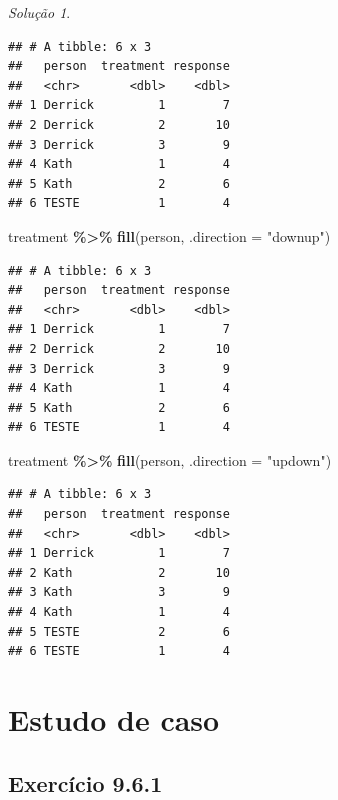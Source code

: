 \documentclass[
]{latex/krantz}
\newenvironment{Shaded}{\begin{snugshade}}{\end{snugshade}}
\newcommand{\AttributeTok}[1]{\textcolor[rgb]{0.13,0.29,0.53}{#1}}
\newcommand{\FunctionTok}[1]{\textcolor[rgb]{0.13,0.29,0.53}{\textbf{#1}}}
\newcommand{\NormalTok}[1]{#1}
\newcommand{\SpecialCharTok}[1]{\textcolor[rgb]{0.81,0.36,0.00}{\textbf{#1}}}
\newcommand{\StringTok}[1]{\textcolor[rgb]{0.31,0.60,0.02}{#1}}
\theoremstyle{definition}
\theoremstyle{definition}
\theoremstyle{definition}
\theoremstyle{definition}
\theoremstyle{remark}
\newtheorem*{solution}{Solução}
\begin{document}
\begin{solution}
\begin{verbatim}
## # A tibble: 6 x 3
##   person  treatment response
##   <chr>       <dbl>    <dbl>
## 1 Derrick         1        7
## 2 Derrick         2       10
## 3 Derrick         3        9
## 4 Kath            1        4
## 5 Kath            2        6
## 6 TESTE           1        4
\end{verbatim}

\begin{Shaded}
\begin{Highlighting}[]
\NormalTok{treatment }\SpecialCharTok{\%\textgreater{}\%} \FunctionTok{fill}\NormalTok{(person, }\AttributeTok{.direction =} \StringTok{"downup"}\NormalTok{)}
\end{Highlighting}
\end{Shaded}

\begin{verbatim}
## # A tibble: 6 x 3
##   person  treatment response
##   <chr>       <dbl>    <dbl>
## 1 Derrick         1        7
## 2 Derrick         2       10
## 3 Derrick         3        9
## 4 Kath            1        4
## 5 Kath            2        6
## 6 TESTE           1        4
\end{verbatim}

\begin{Shaded}
\begin{Highlighting}[]
\NormalTok{treatment }\SpecialCharTok{\%\textgreater{}\%} \FunctionTok{fill}\NormalTok{(person, }\AttributeTok{.direction =} \StringTok{"updown"}\NormalTok{)}
\end{Highlighting}
\end{Shaded}

\begin{verbatim}
## # A tibble: 6 x 3
##   person  treatment response
##   <chr>       <dbl>    <dbl>
## 1 Derrick         1        7
## 2 Kath            2       10
## 3 Kath            3        9
## 4 Kath            1        4
## 5 TESTE           2        6
## 6 TESTE           1        4
\end{verbatim}

\end{solution}

\hypertarget{estudo-de-caso}{%
\section{Estudo de caso}\label{estudo-de-caso}}

\hypertarget{exr9-6-1}{%
\subsection*{Exercício 9.6.1}\label{exr9-6-1}}
\end{document}
